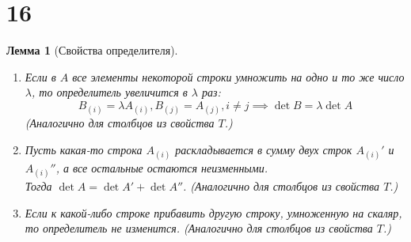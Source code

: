 \documentclass[a4paper,12pt]{article}
\newtheorem*{lemma}{Лемма}
\begin{document}
	\section*{16}
	\begin{lemma}[Свойства определителя]
		\ 
		
		\begin{enumerate}
			\item Если в $A$ все элементы некоторой строки умножить на одно и то же число $\lambda$, то определитель увеличится в $\lambda$ раз: \[B_{(i)} = \lambda A_{(i)}, B_{(j)} = A_{(j)}, i \neq j \implies \det{B} = \lambda\det{A}\] (Аналогично для столбцов из свойства $T$.)
			\item Пусть какая-то строка $A_{(i)}$ раскладывается в сумму двух строк $A_{(i)}'$ и $A_{(i)}''$, а все остальные остаются неизменными.\\Тогда $\det{A} = \det{A'} + \det{A''}$. (Аналогично для столбцов из свойства $T$.)
			\item Если к какой-либо строке прибавить другую строку, умноженную на скаляр, то определитель не изменится. (Аналогично для столбцов из свойства $T$.)
		\end{enumerate}
	\end{lemma}
\end{document}
